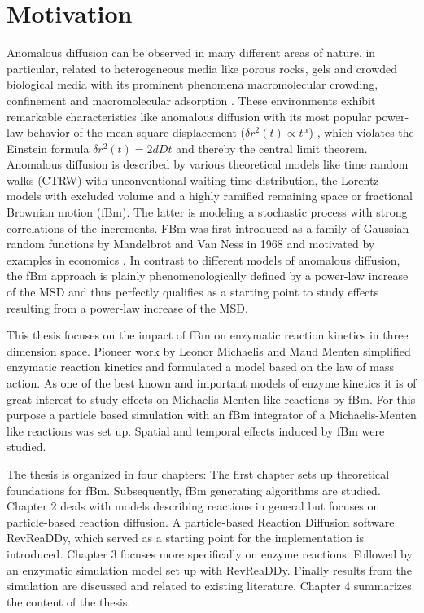 \documentclass[
  a4paper,BCOR10mm,oneside,
  headsepline,footsepline,%
  fleqn,openbib
]{scrbook}
\begin{document}
\chapter*{Motivation}
Anomalous diffusion can be observed in many different areas of nature, in particular, related to heterogeneous media like porous rocks, gels and crowded biological media with its prominent phenomena macromolecular crowding, confinement and macromolecular adsorption \cite{Minton2006}. These environments exhibit remarkable characteristics like anomalous diffusion with its most popular power-law behavior of the mean-square-displacement ($\delta r^2(t)\propto t^{\alpha}$) \cite{Hofling2013}, which violates the Einstein formula $\delta r^2(t)=2 d D t$ and thereby the central limit theorem. Anomalous diffusion is described by various theoretical models like time random walks (CTRW) with unconventional waiting time-distribution, the Lorentz models with excluded volume and a highly ramified remaining space  or fractional Brownian motion (fBm). The latter is modeling a stochastic process with strong correlations of the increments. FBm was first introduced as a family of Gaussian random functions by Mandelbrot and Van Ness in 1968 and motivated by examples in economics \cite{Mandelbrot1968}. In contrast to different models of anomalous diffusion, the fBm approach is plainly phenomenologically defined by a power-law increase of the MSD and thus perfectly qualifies as a starting point to study effects resulting from a power-law increase of the MSD. \par This thesis focuses on the impact of fBm on enzymatic reaction kinetics in three dimension space. Pioneer work by Leonor Michaelis and Maud Menten \cite{michaelis1913kinetik} simplified enzymatic reaction kinetics and formulated a model based on the law of mass action. As one of the best known and important models of enzyme kinetics it is of great interest to study effects on Michaelis-Menten like reactions by fBm. For this purpose a particle based simulation with an fBm integrator of a Michaelis-Menten like reactions was set up. Spatial and temporal effects induced by fBm were studied. 
\par The thesis is organized in four chapters: The first chapter sets up theoretical foundations for fBm. Subsequently, fBm generating algorithms are studied. Chapter 2 deals with models describing reactions in general but focuses on particle-based reaction diffusion. A particle-based Reaction Diffusion software RevReaDDy, which served as a starting point for the implementation is introduced.  Chapter 3 focuses more specifically on enzyme reactions. Followed by an enzymatic simulation model set up with RevReaDDy. Finally results from the simulation are discussed and related to existing literature. Chapter 4 summarizes the content of the thesis. 
\end{document}
